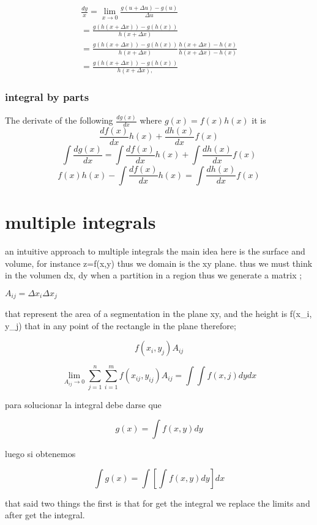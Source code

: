 \documentclass[10pt,a4paper]{article}
\begin{document}
\begin{eqnarray}
\frac{dy}{x} = \lim_{x \to 0} \frac{g(u+ \Delta u) - g(u)} {\Delta u} \\
=\frac{ g(h(x + \Delta x)) - g(h(x))}{h(x + \Delta x)} \\
=\frac{ g(h(x + \Delta x)) - g(h(x)) }{ h(x + \Delta x )}  \frac{h(x + \Delta x) - h(x)}{h(x + \Delta x) - h(x)}\\
=\frac{g(h(x + \Delta x)) - g(h(x)) }{ h(x + \Delta x ),}{}
\end{eqnarray}






\subsubsection*{integral by parts}
The derivate of the following $\frac{dg(x)}{dx}$  where $g(x)=f(x)h(x)$ it is
$$\frac{df(x)}{dx}h(x) + \frac{dh(x)}{dx}f(x)$$
$$ \int \frac{dg(x)}{dx} =  \int \frac{df(x)}{dx}h(x) +  \int \frac{dh(x)}{dx}f(x)$$
$$f(	x)h(x) - \int \frac{df(x)}{dx}h(x) = \int \frac{dh(x)}{dx}f(x)$$



\section{multiple integrals}


an intuitive approach to multiple integrals the main idea here is the surface and volume, for instance z=f(x,y) thus we domain is the xy plane. thus we must think in the volumen dx, dy when a partition in a region thus we generate a matrix ; 

$A_{ij}=\Delta x_{i} \Delta x_{j}$ 

that represent the area of a segmentation in the plane xy,  and the height is f(x_{i}, y_{j})  that in any point of the rectangle in the plane therefore;

$$f(x_{i}, y_{j})A_{ij}$$ 

$$\lim_{A_{ij} \to 0}    \sum_{j=1}^{n} \sum_{i=1}^{m} f(x_{ij},y_{ij})A_{ij} = \int \int f(x,j)dy dx $$

para solucionar la integral  debe darse que 

$$ g(x)=\int f(x,y) dy$$

luego si obtenemos

$$ \int g(x) = \int[\int f(x,y) dy] dx $$

that said two things the first is that for get the integral we replace the limits and after get the integral.
\end{document}
